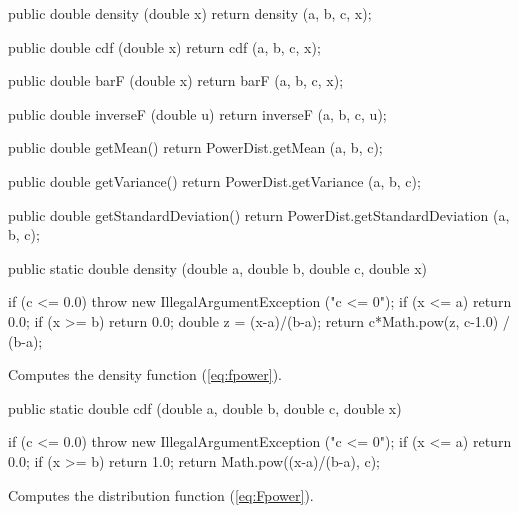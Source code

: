 \begin{code}\begin{hide}

   public double density (double x) {
      return density (a, b, c, x);
   }

   public double cdf (double x) {
      return cdf (a, b, c, x);
   }

   public double barF (double x) {
      return barF (a, b, c, x);
   }

   public double inverseF (double u) {
      return inverseF (a, b, c, u);
   }

   public double getMean() {
      return PowerDist.getMean (a, b, c);
   }

   public double getVariance() {
      return PowerDist.getVariance (a, b, c);
   }

   public double getStandardDeviation() {
      return PowerDist.getStandardDeviation (a, b, c);
   }\end{hide}

   public static double density (double a, double b, double c, double x)\begin{hide} {
      if (c <= 0.0)
         throw new IllegalArgumentException ("c <= 0");
      if (x <= a)
         return 0.0;
      if (x >= b)
         return 0.0;
      double z = (x-a)/(b-a);
      return c*Math.pow(z, c-1.0) / (b-a);
   }\end{hide}
\end{code}
\begin{tabb} Computes the density function (\ref{eq:fpower}).
\end{tabb}
\begin{htmlonly}
\end{htmlonly}
\begin{code}

   public static double cdf (double a, double b, double c, double x)\begin{hide} {
      if (c <= 0.0)
         throw new IllegalArgumentException ("c <= 0");
      if (x <= a)
         return 0.0;
      if (x >= b)
         return 1.0;
      return Math.pow((x-a)/(b-a), c);
   }\end{hide}
\end{code}
 \begin{tabb}
  Computes the distribution function (\ref{eq:Fpower}).
 \end{tabb}
